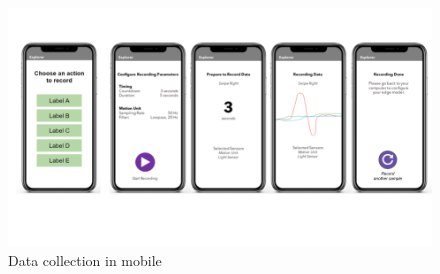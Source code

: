 \begin{figure}[!htb]
    \centering
    \includegraphics[width = \textwidth]{mockups/9.png}
    \caption{Data collection in mobile}
    \label{fig:mobile}
\end{figure}